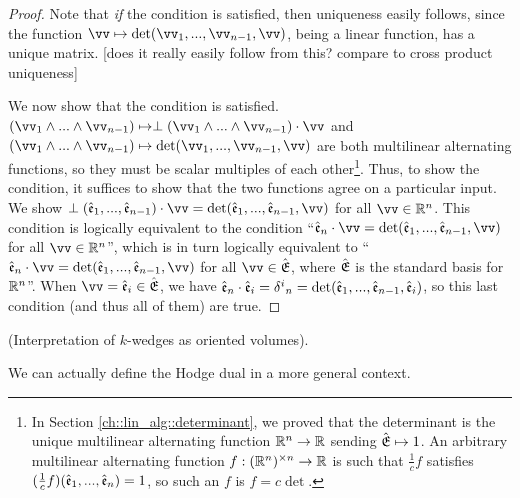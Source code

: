 \begin{proof}
        Note that \textit{if} the condition is satisfied, then uniqueness easily follows, since the function $\vv \mapsto \det(\vv_1, ..., \vv_{n - 1}, \vv)$, being a linear function, has a unique matrix. [does it really easily follow from this? compare to cross product uniqueness]
        
        We now show that the condition is satisfied. $(\vv_1 \wedge ... \wedge \vv_{n - 1}) \mapsto \perp(\vv_1 \wedge ... \wedge \vv_{n - 1}) \cdot \vv$ and $(\vv_1 \wedge ... \wedge \vv_{n - 1}) \mapsto \det(\vv_1, ..., \vv_{n - 1}, \vv)$ are both multilinear alternating functions, so they must be scalar multiples of each other\footnote{In Section \ref{ch::lin_alg::determinant}, we proved that the determinant is the unique multilinear alternating function $\mathbb{R}^n \rightarrow \mathbb{R}$ sending ${\hat{\mathfrak{E}}} \mapsto 1$. An arbitrary multilinear alternating function $f:(\mathbb{R}^n)^{\times n} \rightarrow \mathbb{R}$ is such that $\frac{1}{c}f$ satisfies $(\frac{1}{c}f)(\hat{\mathfrak{e}}_1, ..., \hat{\mathfrak{e}}_n) = 1$, so such an $f$ is $f = c \det$.}. Thus, to show the condition, it suffices to show that the two functions agree on a particular input. We show $\perp(\see_1, ..., \see_{n - 1}) \cdot \vv = \det(\see_1, ..., \see_{n - 1}, \vv)$ for all $\vv \in \R^n$. This condition is logically equivalent to the condition ``$\see_n \cdot \vv = \det(\see_1, ..., \see_{n - 1}, \vv)$ for all $\vv \in \R^n$'', which is in turn logically equivalent to ``$\see_n \cdot \vv = \det(\see_1, ..., \see_{n - 1}, \vv)$ for all $\vv \in \sE$, where ${\hat{\mathfrak{E}}}$ is the standard basis for $\mathbb{R}^n$''.  When $\vv = \see_i \in \sE$, we have $\hat{\mathfrak{e}}_n \cdot \hat{\mathfrak{e}}_i = \delta^i{}_n = \det(\hat{\mathfrak{e}}_1, ..., \hat{\mathfrak{e}}_{n - 1}, \hat{\mathfrak{e}}_i)$, so this last condition (and thus all of them) are true.
\end{proof}

\begin{remark}
    (Interpretation of $k$-wedges as oriented volumes).
\end{remark}

We can actually define the Hodge dual in a more general context.

